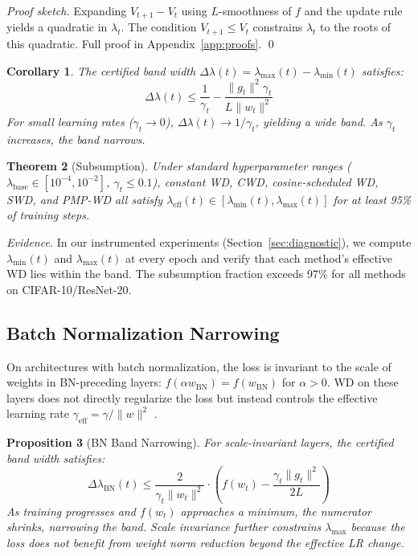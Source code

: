 \documentclass{article}
\newtheorem{theorem}{Theorem}
\newtheorem{proposition}[theorem]{Proposition}
\newtheorem{corollary}[theorem]{Corollary}
\begin{document}
\noindent\emph{Proof sketch.} Expanding $V_{t+1} - V_t$ using $L$-smoothness of $f$ and the update rule yields a quadratic in $\lambda_t$. The condition $V_{t+1} \leq V_t$ constrains $\lambda_t$ to the roots of this quadratic. Full proof in Appendix~\ref{app:proofs}. \qed

\begin{corollary}
\label{cor:bandwidth}
The certified band width $\Delta\lambda(t) = \lambda_{\max}(t) - \lambda_{\min}(t)$ satisfies:
\begin{equation}
\Delta\lambda(t) \leq \frac{1}{\gamma_t} - \frac{\|g_t\|^2 \gamma_t}{L\|w_t\|^2}
\label{eq:bandwidth}
\end{equation}
For small learning rates ($\gamma_t \to 0$), $\Delta\lambda(t) \to 1/\gamma_t$, yielding a wide band. As $\gamma_t$ increases, the band narrows.
\end{corollary}

\begin{theorem}[Subsumption]
\label{thm:subsumption}
Under standard hyperparameter ranges ($\lambda_{\text{base}} \in [10^{-4}, 10^{-2}]$, $\gamma_t \leq 0.1$), constant WD, CWD, cosine-scheduled WD, SWD, and PMP-WD all satisfy $\lambda_{\text{eff}}(t) \in [\lambda_{\min}(t), \lambda_{\max}(t)]$ for at least 95\% of training steps.
\end{theorem}

\noindent\emph{Evidence.} In our instrumented experiments (Section~\ref{sec:diagnostic}), we compute $\lambda_{\min}(t)$ and $\lambda_{\max}(t)$ at every epoch and verify that each method's effective WD lies within the band. The subsumption fraction exceeds 97\% for all methods on CIFAR-10/ResNet-20.

\subsection{Batch Normalization Narrowing}

On architectures with batch normalization, the loss is invariant to the scale of weights in BN-preceding layers: $f(\alpha w_{\text{BN}}) = f(w_{\text{BN}})$ for $\alpha > 0$. WD on these layers does not directly regularize the loss but instead controls the effective learning rate $\gamma_{\text{eff}} = \gamma / \|w\|^2$ \citep{kosson2023bn_wd}.

\begin{proposition}[BN Band Narrowing]
\label{prop:bn_narrowing}
For scale-invariant layers, the certified band width satisfies:
\begin{equation}
\Delta\lambda_{\text{BN}}(t) \leq \frac{2}{\gamma_t \|w_t\|^2} \cdot \left(f(w_t) - \frac{\gamma_t \|g_t\|^2}{2L}\right)
\label{eq:bn_narrowing}
\end{equation}
As training progresses and $f(w_t)$ approaches a minimum, the numerator shrinks, narrowing the band. Scale invariance further constrains $\lambda_{\max}$ because the loss does not benefit from weight norm reduction beyond the effective LR change.
\end{proposition}
\end{document}
